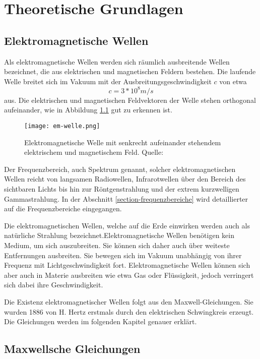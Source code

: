 
\chapter{Theoretische Grundlagen}
\section{Elektromagnetische Wellen}
Als elektromagnetische Wellen werden sich räumlich ausbreitende Wellen bezeichnet, die aus elektrischen und magnetischen Feldern bestehen. Die laufende Welle breitet sich im Vakuum mit der Ausbreitungsgeschwindigkeit \(c\) von etwa \[c= 3*10^8 m/s\] aus. Die elektrischen und magnetischen Feldvektoren der Welle stehen orthogonal aufeinander, wie in Abbildung \ref{elektromagnetische Welle} gut zu erkennen ist.

\begin{figure}[ht]
	\centering
	\texttt{[image: em-welle.png]}
	\caption[Elektromagnetische Welle mit senkrecht
	aufeinander stehendem elektrischem und magnetischem Feld]{Elektromagnetische Welle mit senkrecht aufeinander stehendem elektrischem und magnetischem Feld. Quelle: \cite[Harten, S. 130]{Harten:2017}} 
	\label{elektromagnetische Welle}
\end{figure}

Der Frequenzbereich, auch Spektrum genannt, solcher elektromagnetischen Wellen reicht von langsamen Radiowellen, Infrarotwellen über den Bereich des sichtbaren Lichts bis hin zur Röntgenstrahlung und der extrem kurzwelligen Gammastrahlung. In der Abschnitt \ref{section-frequenzbereiche} wird detaillierter auf die Frequenzbereiche eingegangen.

Die elektromagnetischen Wellen, welche auf die Erde einwirken werden auch als natürliche Strahlung bezeichnet.Elektromagnetische Wellen benötigen kein Medium, um sich auszubreiten. Sie können sich daher auch über weiteste Entfernungen ausbreiten. Sie bewegen sich im Vakuum unabhängig von ihrer Frequenz mit Lichtgeschwindigkeit fort. Elektromagnetische Wellen können sich aber auch in Materie ausbreiten wie etwa Gas oder Flüssigkeit, jedoch verringert sich dabei ihre Geschwindigkeit.

Die Existenz elektromagnetischer Wellen folgt aus den Maxwell-Gleichungen. Sie wurden 1886 von H. Hertz erstmals durch den elektrischen Schwingkreis erzeugt. Die Gleichungen werden im folgenden Kapitel genauer erklärt.

\section{Maxwellsche Gleichungen}

